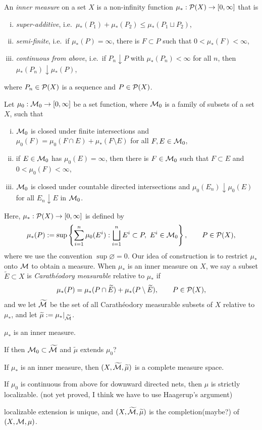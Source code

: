 \documentclass{../../large}
\begin{document}
\begin{prb}
An \emph{inner measure} on a set $X$ is a non-infinity function $\mu_*:\mathcal{P}(X)\to[0,\infty]$ that is
\begin{enumerate}[(i)]
\item \emph{super-additive}, i.e.~$\mu_*(P_1)+\mu_*(P_2)\le\mu_*(P_1\sqcup P_2)$,
\item \emph{semi-finite}, i.e.~if $\mu_*(P)=\infty$, there is $F\subset P$ such that $0<\mu_*(F)<\infty$,
\item \emph{continuous from above}, i.e.~if $P_n\downarrow P$ with $\mu_*(P_n)<\infty$ for all $n$, then $\mu_*(P_n)\downarrow\mu_*(P)$,
\end{enumerate}
where $P_n\in\mathcal{P}(X)$ is a sequence and $P\in\mathcal{P}(X)$.

Let $\mu_0:\mathcal{M}_0\to[0,\infty]$ be a set function, where $\mathcal{M}_0$ is a family of subsets of a set $X$, such that
\begin{enumerate}[(i)]
\item $\mathcal{M}_0$ is closed under finite intersections and $\mu_0(F)=\mu_0(F\cap E)+\mu_*(F\setminus E)$ for all $F,E\in\mathcal{M}_0$,
\item if $E\in\mathcal{M}_0$ has $\mu_0(E)=\infty$, then there is $F\in\mathcal{M}_0$ such that $F\subset E$ and $0<\mu_0(F)<\infty$,
\item $\mathcal{M}_0$ is closed under countable directed intersections and $\mu_0(E_n)\downarrow\mu_0(E)$ for all $E_n\downarrow E$ in $\mathcal{M}_0$.
\end{enumerate}
Here, $\mu_*:\mathcal{P}(X)\to[0,\infty]$ is defined by
\[\mu_*(P):=\sup\left\{\sum_{i=1}^n\mu_0(E^i):\bigsqcup_{i=1}^nE^i\subset P,\ E^i\in\mathcal{M}_0\right\},\qquad P\in\mathcal{P}(X),\]
where we use the convention $\sup\varnothing=0$.
Our idea of construction is to restrict $\mu_*$ onto $\mathcal{M}$ to obtain a measure.
When $\mu_*$ is an inner measure on $X$, we say a subset $\tilde E\subset X$ is \emph{Carath\'eodory measurable} relative to $\mu_*$ if
\[\mu_*(P)=\mu_*(P\cap\widetilde E)+\mu_*(P\setminus\widetilde E),\qquad P\in\mathcal{P}(X),\]
and we let $\widetilde{\mathcal{M}}$ be the set of all Carath\'eodory measurable subsets of $X$ relative to $\mu_*$, and let $\widetilde\mu:=\mu_*|_{\widetilde{\mathcal{M}}}$.
\begin{parts}
\item $\mu_*$ is an inner measure.
\item If  then $\mathcal{M}_0\subset\widetilde{\mathcal{M}}$ and $\tilde\mu$ extends $\mu_0$?
\item If $\mu_*$ is an inner measure, then $(X,\widetilde{\mathcal{M}},\widetilde\mu)$ is a complete measure space.
\item If $\mu_0$ is continuous from above for downward directed nets, then $\mu$ is strictly localizable. (not yet proved, I think we have to use Haagerup's argument)
\item localizable extension is unique, and $(X,\widetilde{\mathcal{M}},\widetilde\mu)$ is the completion(maybe?) of $(X,\mathcal{M},\mu)$.
\end{parts}
\end{prb}
\end{document}
